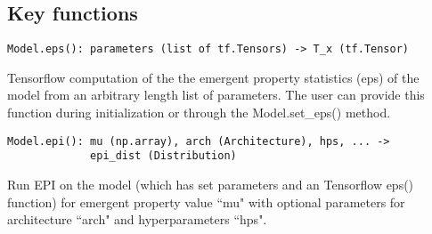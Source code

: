 \documentclass[11pt]{article}
\begin{document}

\subsection{Key functions}
\begin{verbatim}
Model.eps(): parameters (list of tf.Tensors) -> T_x (tf.Tensor)
\end{verbatim}
Tensorflow computation of the the emergent property statistics (eps) of the model  from an arbitrary length list of parameters.  The user can provide this function during initialization or through the Model.set\_eps() method.

\begin{verbatim}
Model.epi(): mu (np.array), arch (Architecture), hps, ... -> 
             epi_dist (Distribution)
\end{verbatim}
Run EPI on the model (which has set parameters and an Tensorflow eps() function) for emergent property value ``mu" with optional parameters for architecture ``arch" and hyperparameters ``hps".
\end{document}
